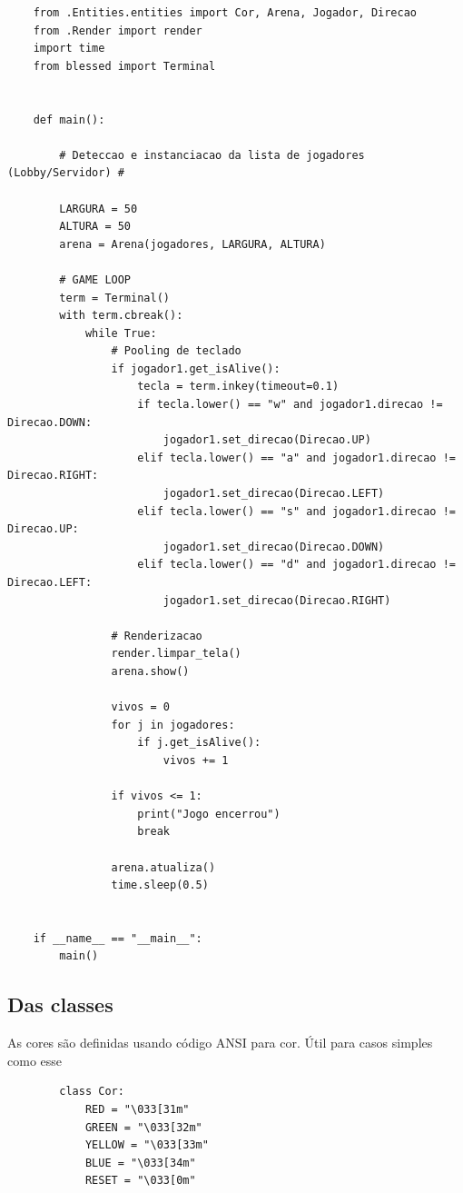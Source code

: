 \documentclass{cisXXX} %
\begin{document}
    \begin{lstlisting}
    from .Entities.entities import Cor, Arena, Jogador, Direcao
    from .Render import render
    import time
    from blessed import Terminal
    
    
    def main():
    
        # Deteccao e instanciacao da lista de jogadores (Lobby/Servidor) #
    
        LARGURA = 50
        ALTURA = 50
        arena = Arena(jogadores, LARGURA, ALTURA)
    
        # GAME LOOP
        term = Terminal()
        with term.cbreak():
            while True:
                # Pooling de teclado
                if jogador1.get_isAlive():
                    tecla = term.inkey(timeout=0.1)
                    if tecla.lower() == "w" and jogador1.direcao != Direcao.DOWN:
                        jogador1.set_direcao(Direcao.UP)
                    elif tecla.lower() == "a" and jogador1.direcao != Direcao.RIGHT:
                        jogador1.set_direcao(Direcao.LEFT)
                    elif tecla.lower() == "s" and jogador1.direcao != Direcao.UP:
                        jogador1.set_direcao(Direcao.DOWN)
                    elif tecla.lower() == "d" and jogador1.direcao != Direcao.LEFT:
                        jogador1.set_direcao(Direcao.RIGHT)
    
                # Renderizacao
                render.limpar_tela()
                arena.show()
    
                vivos = 0
                for j in jogadores:
                    if j.get_isAlive():
                        vivos += 1
    
                if vivos <= 1:
                    print("Jogo encerrou")
                    break
    
                arena.atualiza()
                time.sleep(0.5)
    
    
    if __name__ == "__main__":
        main()
    \end{lstlisting}
    \subsection{Das classes}
    As cores são definidas usando código ANSI para cor. Útil para casos simples como esse
    \begin{lstlisting}
        class Cor:
            RED = "\033[31m"
            GREEN = "\033[32m"
            YELLOW = "\033[33m"
            BLUE = "\033[34m"
            RESET = "\033[0m"
    \end{lstlisting}
\end{document}
